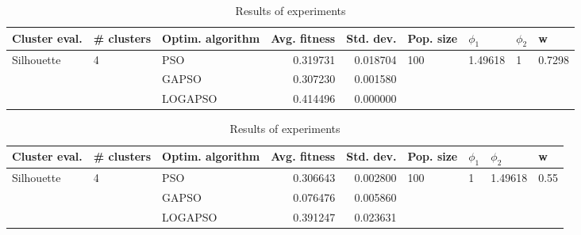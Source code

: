 \documentclass{article}
\begin{document}
\begin{table}
\centering
\caption{Results of experiments}
\begin{tabular}{lllrrllll}
\toprule
              Cluster eval. &        \# clusters & Optim. algorithm &  Avg. fitness &  Std. dev. &            Pop. size &               $\phi_{1}$ &         $\phi_{2}$ &                       w \\
\midrule
\multirow{3}{*}{Silhouette} & \multirow{3}{*}{4} &              PSO &      0.319731 &   0.018704 & \multirow{3}{*}{100} & \multirow{3}{*}{1.49618} & \multirow{3}{*}{1} & \multirow{3}{*}{0.7298} \\
                            &                    &            GAPSO &      0.307230 &   0.001580 &                      &                          &                    &                         \\
                            &                    &          LOGAPSO &      0.414496 &   0.000000 &                      &                          &                    &                         \\
\bottomrule
\end{tabular}
\end{table}
\begin{table}
\centering
\caption{Results of experiments}
\begin{tabular}{lllrrllll}
\toprule
              Cluster eval. &        \# clusters & Optim. algorithm &  Avg. fitness &  Std. dev. &            Pop. size &         $\phi_{1}$ &               $\phi_{2}$ &                     w \\
\midrule
\multirow{3}{*}{Silhouette} & \multirow{3}{*}{4} &              PSO &      0.306643 &   0.002800 & \multirow{3}{*}{100} & \multirow{3}{*}{1} & \multirow{3}{*}{1.49618} & \multirow{3}{*}{0.55} \\
                            &                    &            GAPSO &      0.076476 &   0.005860 &                      &                    &                          &                       \\
                            &                    &          LOGAPSO &      0.391247 &   0.023631 &                      &                    &                          &                       \\
\bottomrule
\end{tabular}
\end{table}
\end{document}
